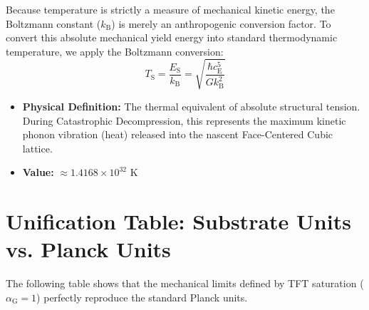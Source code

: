 Because temperature is strictly a measure of mechanical kinetic energy, the Boltzmann constant ($k_{\mathrm{B}}$) is merely an anthropogenic conversion factor. To convert this absolute mechanical yield energy into standard thermodynamic temperature, we apply the Boltzmann conversion:
\begin{equation}
    T_{\mathrm{S}} = \frac{E_{\mathrm{S}}}{k_{\mathrm{B}}} = \sqrt{\frac{\hbar c_{\mathrm{E}}^5}{G k_{\mathrm{B}}^2}}
\end{equation}
\begin{itemize}
    \item \textbf{Physical Definition:} The thermal equivalent of absolute structural tension. During Catastrophic Decompression, this represents the maximum kinetic phonon vibration (heat) released into the nascent Face-Centered Cubic lattice.
    \item \textbf{Value:} $\approx 1.4168 \times 10^{32}$ K
\end{itemize}

\section{Unification Table: Substrate Units vs. Planck Units}
The following table shows that the mechanical limits defined by TFT saturation ($\alpha_{\mathrm{G}} = 1$) perfectly reproduce the standard Planck units.

